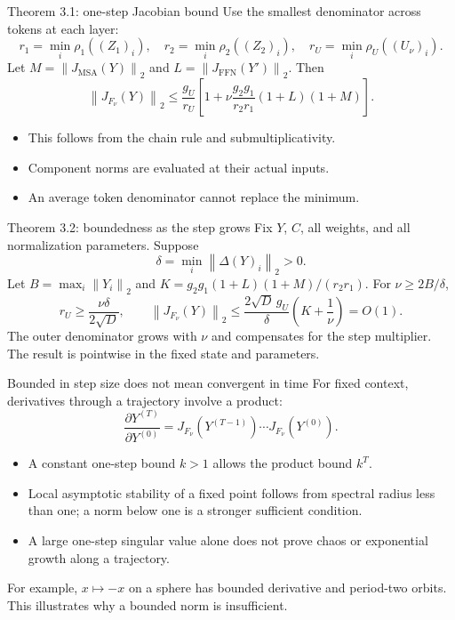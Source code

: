 \documentclass[aspectratio=169,11pt]{beamer}
\newcommand{\norm}[1]{\left\|#1\right\|}
\newcommand{\MSA}{\operatorname{MSA}}
\newcommand{\FFN}{\operatorname{FFN}}
\begin{document}
\begin{frame}{Theorem 3.1: one-step Jacobian bound}
Use the smallest denominator across tokens at each layer:
\[
r_1=\min_i\rho_1((Z_1)_i),\quad
r_2=\min_i\rho_2((Z_2)_i),\quad
r_U=\min_i\rho_U((U_\nu)_i).
\]
Let $M=\norm{J_{\MSA}(Y)}_2$ and $L=\norm{J_{\FFN}(Y')}_2$. Then
\[
\boxed{\norm{J_{F_\nu}(Y)}_2\leq
\frac{g_U}{r_U}\left[1+\nu\frac{g_2g_1}{r_2r_1}(1+L)(1+M)\right].}
\]
\vspace{1em}
\begin{itemize}
\item This follows from the chain rule and submultiplicativity.
\item Component norms are evaluated at their actual inputs.
\item An average token denominator cannot replace the minimum.
\end{itemize}
\end{frame}

\begin{frame}{Theorem 3.2: boundedness as the step grows}
Fix $Y$, $C$, all weights, and all normalization parameters. Suppose
\[
\delta=\min_i\norm{\Delta(Y)_i}_2>0.
\]
Let $B=\max_i\norm{Y_i}_2$ and
$K=g_2g_1(1+L)(1+M)/(r_2r_1)$. For $\nu\geq2B/\delta$,
\[
r_U\geq\frac{\nu\delta}{2\sqrt D},\qquad
\norm{J_{F_\nu}(Y)}_2\leq
\frac{2\sqrt D\,g_U}{\delta}\left(K+\frac1\nu\right)=O(1).
\]
\vspace{1em}
The outer denominator grows with $\nu$ and compensates for the step multiplier.
The result is pointwise in the fixed state and parameters.
\end{frame}

\begin{frame}{Bounded in step size does not mean convergent in time}
For fixed context, derivatives through a trajectory involve a product:
\[
\frac{\partial Y^{(T)}}{\partial Y^{(0)}}
=J_{F_\nu}(Y^{(T-1)})\cdots J_{F_\nu}(Y^{(0)}).
\]
\begin{itemize}
\item A constant one-step bound $k>1$ allows the product bound $k^T$.
\item Local asymptotic stability of a fixed point follows from spectral radius
less than one; a norm below one is a stronger sufficient condition.
\item A large one-step singular value alone does not prove chaos or exponential
growth along a trajectory.
\end{itemize}
\vspace{0.5em}
For example, $x\mapsto-x$ on a sphere has bounded derivative and period-two
orbits. This illustrates why a bounded norm is insufficient.
\end{frame}
\end{document}
